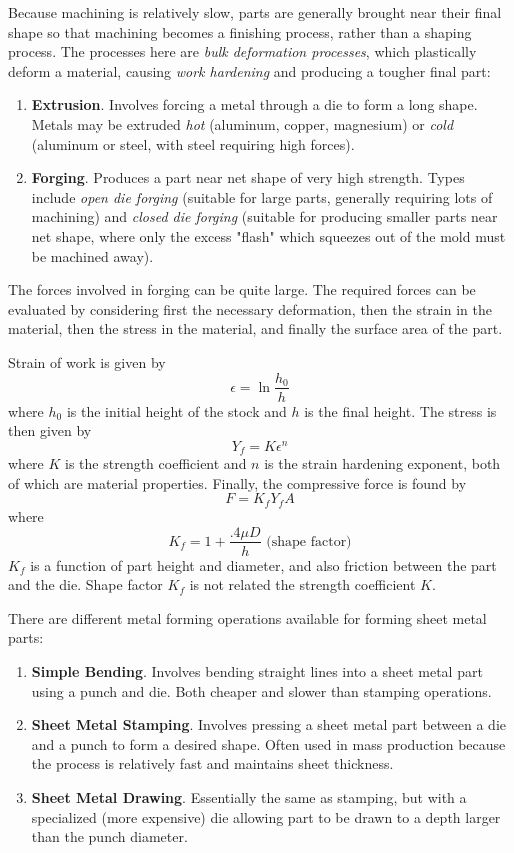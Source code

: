 Because machining is relatively slow, parts are generally brought near their final shape so that machining becomes a finishing process, rather than a shaping process. The processes here are \textit{bulk deformation processes}, which plastically deform a material, causing \textit{work hardening} and producing a tougher final part: \begin{enumerate}
    \item[] \textbf{Extrusion}. Involves forcing a metal through a die to form a long shape. Metals may be extruded \textit{hot} (aluminum, copper, magnesium) or \textit{cold} (aluminum or steel, with steel requiring high forces).
    \item[] \textbf{Forging}. Produces a part near net shape of very high strength. Types include \textit{open die forging} (suitable for large parts, generally requiring lots of machining) and \textit{closed die forging} (suitable for producing smaller parts near net shape, where only the excess "flash" which squeezes out of the mold must be machined away).
\end{enumerate}

The forces involved in forging can be quite large. The required forces can be evaluated by considering first the necessary deformation, then the strain in the material, then the stress in the material, and finally the surface area of the part.

Strain of work is given by \[\epsilon = \ln \frac{h_0}{h}\] where $h_0$ is the initial height of the stock and $h$ is the final height. The stress is then given by \[Y_f = K\epsilon ^n\] where $K$ is the strength coefficient and $n$ is the strain hardening exponent, both of which are material properties. Finally, the compressive force is found by \[F = K_f Y_f A\] where \[K_f = 1 + \frac{.4\mu D}{h} \text{ (shape factor)}\] $K_f$ is a function of part height and diameter, and also friction between the part and the die. Shape factor $K_f$ is not related the strength coefficient $K$.

There are different metal forming operations available for forming sheet metal parts: \begin{enumerate}
    \item[] \textbf{Simple Bending}. Involves bending straight lines into a sheet metal part using a punch and die. Both cheaper and slower than stamping operations.
    \item[] \textbf{Sheet Metal Stamping}. Involves pressing a sheet metal part between a die and a punch to form a desired shape. Often used in mass production because the process is relatively fast and maintains sheet thickness.
    \item[] \textbf{Sheet Metal Drawing}. Essentially the same as stamping, but with a specialized (more expensive) die allowing part to be drawn to a depth larger than the punch diameter.
\end{enumerate}

